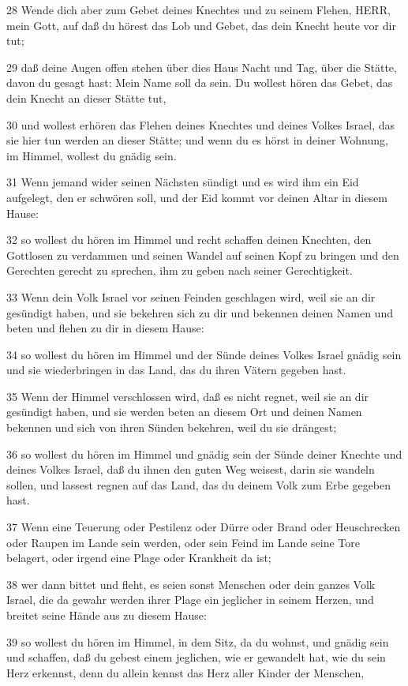 \par 28 Wende dich aber zum Gebet deines Knechtes und zu seinem Flehen, HERR, mein Gott, auf daß du hörest das Lob und Gebet, das dein Knecht heute vor dir tut;
\par 29 daß deine Augen offen stehen über dies Haus Nacht und Tag, über die Stätte, davon du gesagt hast: Mein Name soll da sein. Du wollest hören das Gebet, das dein Knecht an dieser Stätte tut,
\par 30 und wollest erhören das Flehen deines Knechtes und deines Volkes Israel, das sie hier tun werden an dieser Stätte; und wenn du es hörst in deiner Wohnung, im Himmel, wollest du gnädig sein.
\par 31 Wenn jemand wider seinen Nächsten sündigt und es wird ihm ein Eid aufgelegt, den er schwören soll, und der Eid kommt vor deinen Altar in diesem Hause:
\par 32 so wollest du hören im Himmel und recht schaffen deinen Knechten, den Gottlosen zu verdammen und seinen Wandel auf seinen Kopf zu bringen und den Gerechten gerecht zu sprechen, ihm zu geben nach seiner Gerechtigkeit.
\par 33 Wenn dein Volk Israel vor seinen Feinden geschlagen wird, weil sie an dir gesündigt haben, und sie bekehren sich zu dir und bekennen deinen Namen und beten und flehen zu dir in diesem Hause:
\par 34 so wollest du hören im Himmel und der Sünde deines Volkes Israel gnädig sein und sie wiederbringen in das Land, das du ihren Vätern gegeben hast.
\par 35 Wenn der Himmel verschlossen wird, daß es nicht regnet, weil sie an dir gesündigt haben, und sie werden beten an diesem Ort und deinen Namen bekennen und sich von ihren Sünden bekehren, weil du sie drängest;
\par 36 so wollest du hören im Himmel und gnädig sein der Sünde deiner Knechte und deines Volkes Israel, daß du ihnen den guten Weg weisest, darin sie wandeln sollen, und lassest regnen auf das Land, das du deinem Volk zum Erbe gegeben hast.
\par 37 Wenn eine Teuerung oder Pestilenz oder Dürre oder Brand oder Heuschrecken oder Raupen im Lande sein werden, oder sein Feind im Lande seine Tore belagert, oder irgend eine Plage oder Krankheit da ist;
\par 38 wer dann bittet und fleht, es seien sonst Menschen oder dein ganzes Volk Israel, die da gewahr werden ihrer Plage ein jeglicher in seinem Herzen, und breitet seine Hände aus zu diesem Hause:
\par 39 so wollest du hören im Himmel, in dem Sitz, da du wohnst, und gnädig sein und schaffen, daß du gebest einem jeglichen, wie er gewandelt hat, wie du sein Herz erkennst, denn du allein kennst das Herz aller Kinder der Menschen,
